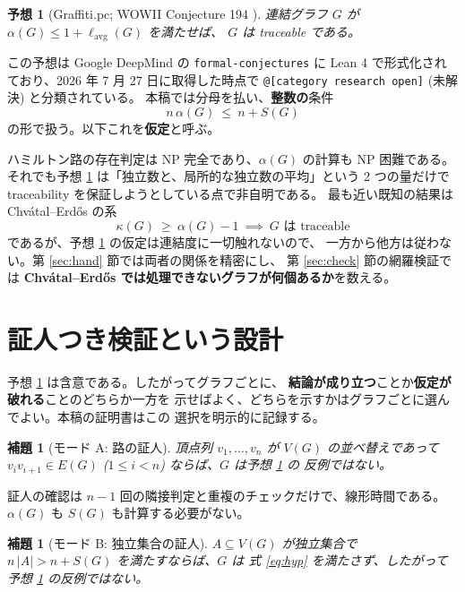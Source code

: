 \documentclass[paper=a4,fontsize=10.5pt,jafontsize=10.5pt]{jlreq}
\theoremstyle{plain}
\newtheorem{lemma}[theorem]{補題}
\newtheorem{conjecture}[theorem]{予想}
\theoremstyle{definition}
\begin{document}
\begin{conjecture}[Graffiti.pc; WOWII Conjecture 194 \cite{wowii}]\label{conj:194}
連結グラフ $G$ が $\alpha(G) \le 1 + \ell_{\mathrm{avg}}(G)$ を満たせば、
$G$ は traceable である。
\end{conjecture}

この予想は Google DeepMind の \texttt{formal-conjectures} \cite{formalconj} に
Lean 4 で形式化されており、2026 年 7 月 27 日に取得した時点で
\texttt{@[category research open]} (未解決) と分類されている。
本稿では分母を払い、\textbf{整数の}条件
\begin{equation}\label{eq:hyp}
n \, \alpha(G) \ \le \ n + S(G)
\end{equation}
の形で扱う。以下これを\textbf{仮定}と呼ぶ。

ハミルトン路の存在判定は NP 完全であり、$\alpha(G)$ の計算も NP 困難である。
それでも予想 \ref{conj:194} は「独立数と、局所的な独立数の平均」という
2 つの量だけで traceability を保証しようとしている点で非自明である。
最も近い既知の結果は Chvátal--Erdős \cite{chvatalerdos} の系
\[ \kappa(G) \ \ge \ \alpha(G) - 1 \ \implies \ G \text{ は traceable} \]
であるが、予想 \ref{conj:194} の仮定は連結度に一切触れないので、
一方から他方は従わない。第 \ref{sec:hand} 節では両者の関係を精密にし、
第 \ref{sec:check} 節の網羅検証では
\textbf{Chvátal--Erdős では処理できないグラフが何個あるか}を数える。

\section{証人つき検証という設計}\label{sec:design}

予想 \ref{conj:194} は含意である。したがってグラフごとに、
\textbf{結論が成り立つ}ことか\textbf{仮定が破れる}ことのどちらか一方を
示せばよく、どちらを示すかはグラフごとに選んでよい。本稿の証明書はこの
選択を明示的に記録する。

\begin{lemma}[モード A: 路の証人]\label{lem:path}
頂点列 $v_1, \dots, v_n$ が $V(G)$ の並べ替えであって
$v_i v_{i+1} \in E(G)$ ($1 \le i < n$) ならば、$G$ は予想 \ref{conj:194} の
反例ではない。
\end{lemma}

証人の確認は $n-1$ 回の隣接判定と重複のチェックだけで、線形時間である。
$\alpha(G)$ も $S(G)$ も計算する必要がない。

\begin{lemma}[モード B: 独立集合の証人]\label{lem:mask}
$A \subseteq V(G)$ が独立集合で $n\,|A| > n + S(G)$ を満たすならば、$G$ は
式 \eqref{eq:hyp} を満たさず、したがって予想 \ref{conj:194} の反例ではない。
\end{lemma}
\end{document}
